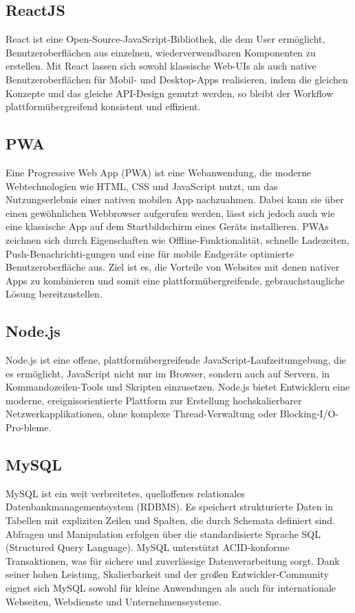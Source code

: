 \subsection{ReactJS}
React ist eine Open-Source-JavaScript-Bibliothek, die dem User ermöglicht, Benutzeroberflächen aus einzelnen, wiederverwendbaren Komponenten zu erstellen. Mit React lassen sich sowohl klassische Web-UIs als auch native Benutzeroberflächen für Mobil- und Desktop-Apps realisieren, indem die gleichen Konzepte und das gleiche API-Design genutzt werden, so bleibt der Workflow plattformübergreifend konsistent und effizient. \autocite{react}
\subsection{PWA}
Eine Progressive Web App (PWA) ist eine Webanwendung, die moderne Webtechnologien wie HTML, CSS und JavaScript nutzt, um das Nutzungserlebnis einer nativen mobilen App nachzuahmen. Dabei kann sie über einen gewöhnlichen Webbrowser aufgerufen werden, lässt sich jedoch auch wie eine klassische App auf dem Startbildschirm eines Geräts installieren. PWAs zeichnen sich durch Eigenschaften wie Offline-Funktionalität, schnelle Ladezeiten, Push-Benachrichti-gungen und eine für mobile Endgeräte optimierte Benutzeroberfläche aus. Ziel ist es, die Vorteile von Websites mit denen nativer Apps zu kombinieren und somit eine plattformübergreifende, gebrauchstaugliche Lösung bereitzustellen. \autocite{pwa}
\subsection{Node.js}
Node.js ist eine offene, plattformübergreifende JavaScript-Laufzeitumgebung, die es ermöglicht, JavaScript nicht nur im Browser, sondern auch auf Servern, in Kommandozeilen-Tools und Skripten einzusetzen. Node.js bietet Entwicklern eine moderne, ereignisorientierte Plattform zur Erstellung hochskalierbarer Netzwerkapplikationen, ohne komplexe Thread-Verwaltung oder Blocking-I/O-Pro-bleme. \autocite{nodejs}
\subsection{MySQL}
MySQL ist ein weit verbreitetes, quelloffenes relationales Datenbankmanagementsystem (RDBMS). Es speichert strukturierte Daten in Tabellen mit expliziten Zeilen und Spalten, die durch Schemata definiert sind. Abfragen und Manipulation erfolgen über die standardisierte Sprache SQL (Structured Query Language). MySQL unterstützt ACID-konforme Transaktionen, was für sichere und zuverlässige Datenverarbeitung sorgt. Dank seiner hohen Leistung, Skalierbarkeit und der großen Entwickler-Community eignet sich MySQL sowohl für kleine Anwendungen als auch für internationale Webseiten, Webdienste und Unternehmenssysteme. \autocite{mysql}
